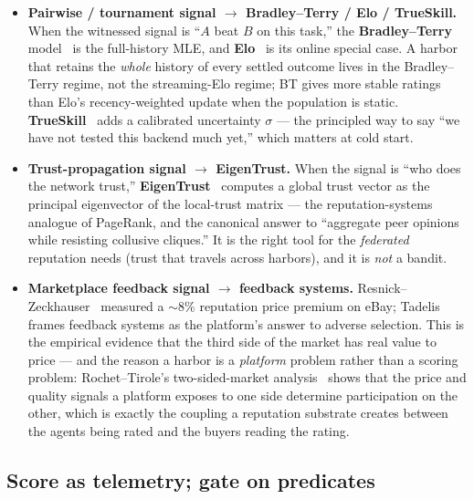 \documentclass[11pt,a4paper]{article}
\theoremstyle{definition}
\begin{document}
\begin{itemize}[leftmargin=1.4em]
  \item \textbf{Pairwise / tournament signal $\to$ Bradley--Terry / Elo /
  TrueSkill.} When the witnessed signal is ``$A$ beat $B$ on this task,'' the
  \textbf{Bradley--Terry} model~ is the full-history MLE,
  and \textbf{Elo}~ is its online special case. A harbor that
  retains the \emph{whole} history of every settled outcome lives in the
  Bradley--Terry regime, not the streaming-Elo regime; BT gives more stable
  ratings than Elo's recency-weighted update when the population is static.
  \textbf{TrueSkill}~ adds a calibrated uncertainty
  $\sigma$ --- the principled way to say ``we have not tested this backend much
  yet,'' which matters at cold start.
  \item \textbf{Trust-propagation signal $\to$ EigenTrust.} When the signal is
  ``who does the network trust,'' \textbf{EigenTrust}~
  computes a global trust vector as the principal eigenvector of the
  local-trust matrix --- the reputation-systems analogue of PageRank, and the
  canonical answer to ``aggregate peer opinions while resisting collusive
  cliques.'' It is the right tool for the \emph{federated} reputation  needs (trust that travels across harbors), and it is \emph{not} a bandit.
  \item \textbf{Marketplace feedback signal $\to$ feedback systems.}
  Resnick--Zeckhauser~ measured a ${\sim}8\%$ reputation
  price premium on eBay; Tadelis~ frames feedback systems as the
  platform's answer to adverse selection. This is the empirical evidence that the
  third side of the market has real value to price --- and the reason a harbor is a
  \emph{platform} problem rather than a scoring problem: Rochet--Tirole's
  two-sided-market analysis~ shows that the price and
  quality signals a platform exposes to one side determine participation on the
  other, which is exactly the coupling a reputation substrate creates between the
  agents being rated and the buyers reading the rating.
\end{itemize}


\subsection{Score as telemetry; gate on predicates}
\end{document}
